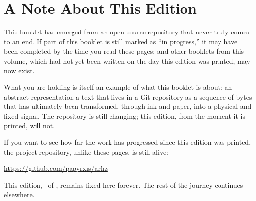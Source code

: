 \chapter*{A Note About This Edition}

This booklet has emerged from an open-source repository that never truly
comes to an end. If part of this booklet is still marked as ``in progress,''
it may have been completed by the time you read these pages; and other
booklets from this volume, which had not yet been written on the day this
edition was printed, may now exist.

What you are holding is itself an example of what this booklet is about:
an abstract representation a text that lives in a Git repository as a
sequence of bytes that has ultimately been transformed, through ink and
paper, into a physical and fixed signal. The repository is still changing;
this edition, from the moment it is printed, will not.

If you want to see how far the work has progressed since this edition was
printed, the project repository, unlike these pages, is still alive:

\begin{center}
\url{https://github.com/papyrxis/arliz}
\end{center}

This edition, \BookletEdition\ of \BookletYear, remains fixed here forever.
The rest of the journey continues elsewhere.
